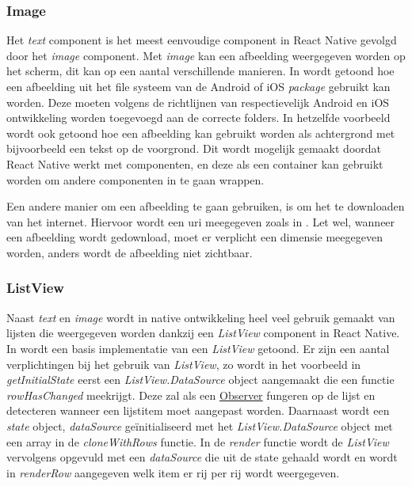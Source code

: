 		\subsubsection{Image}	
Het \emph{text} component is het meest eenvoudige component in React Native gevolgd door het \emph{image} component. Met \emph{image} kan een afbeelding weergegeven worden op het scherm, dit kan op een aantal verschillende manieren.
In  wordt getoond hoe een afbeelding uit het file systeem van de Android of iOS \emph{package} gebruikt kan worden. Deze moeten volgens de richtlijnen van respectievelijk Android en iOS ontwikkeling worden toegevoegd aan de correcte folders. In hetzelfde voorbeeld wordt ook getoond hoe een afbeelding kan gebruikt worden als achtergrond met bijvoorbeeld een tekst op de voorgrond. Dit wordt mogelijk gemaakt doordat React Native werkt met componenten, en deze als een container kan gebruikt worden om andere componenten in te gaan wrappen.     

Een andere manier om een afbeelding te gaan gebruiken, is om het te downloaden van het internet. Hiervoor wordt een uri meegegeven zoals in . Let wel, wanneer een afbeelding wordt gedownload, moet er verplicht een dimensie meegegeven worden, anders wordt de afbeelding niet zichtbaar.\citep{api:ReactNative}

\subsubsection{ListView}
Naast \emph{text} en \emph{image} wordt in native ontwikkeling heel veel gebruik gemaakt van lijsten die weergegeven worden dankzij een \emph{ListView} component in React Native. In  wordt een basis implementatie van een \emph{ListView} getoond. Er zijn een aantal verplichtingen bij het gebruik van \emph{ListView}, zo wordt in het voorbeeld in \emph{getInitialState} eerst een \emph{ListView.DataSource} object aangemaakt die een functie \emph{rowHasChanged} meekrijgt. Deze zal als een \hyperref[observer]{Observer} fungeren op de lijst en detecteren wanneer een lijstitem moet aangepast worden. Daarnaast wordt een \emph{state} object, \emph{dataSource} geïnitialiseerd met het \emph{ListView.DataSource} object met een array in de \emph{cloneWithRows} functie. In de \emph{render} functie wordt de \emph{ListView} vervolgens opgevuld met een \emph{dataSource} die uit de state gehaald wordt en wordt in \emph{renderRow} aangegeven welk item er rij per rij wordt weergegeven.\citep{api:ReactNative}

